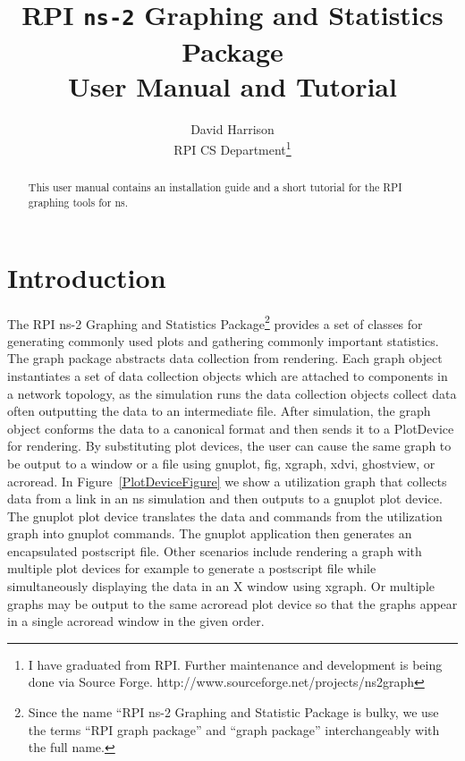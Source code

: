 \documentclass[11pt]{article}
\begin{document}

\title{RPI \verb|ns-2| Graphing and Statistics Package\\
       User Manual and Tutorial}
\author{David Harrison \\
        RPI CS Department\footnote{I have graduated from RPI. Further maintenance and development is being done via Source Forge. http://www.sourceforge.net/projects/ns2graph}}

\maketitle

\begin{abstract}
This user manual contains an installation guide and a short
tutorial for the RPI graphing tools for ns.
\end{abstract}


\section{Introduction}

The RPI ns-2 Graphing and Statistics Package\footnote{Since the name
``RPI ns-2 Graphing and Statistic Package is bulky, we use the
terms ``RPI graph package'' and ``graph package'' interchangeably with
the full name.} provides a set of classes for generating commonly used
plots and gathering commonly important statistics.  The graph package
abstracts data collection from rendering.  Each graph object
instantiates a set of data collection objects which are attached to
components in a network topology, as the simulation runs the data
collection objects collect data often outputting the data to an
intermediate file.  After simulation, the graph object conforms the
data to a canonical format and then sends it to a PlotDevice for
rendering.  By substituting plot devices, the user can cause the same
graph to be output to a window or a file using gnuplot, fig, xgraph,
xdvi, ghostview, or acroread.  In Figure~\ref{PlotDeviceFigure} we
show a utilization graph that collects data from a link in an ns
simulation and then outputs to a gnuplot plot device.  The gnuplot plot
device translates the data and commands from the utilization graph
into gnuplot commands.  The gnuplot application then generates an
encapsulated postscript file.  Other scenarios include rendering a
graph with multiple plot devices for example to generate a postscript
file while simultaneously displaying the data in an X window using
xgraph.  Or multiple graphs may be output to the same acroread plot
device so that the graphs appear in a single acroread window in the
given order.
\end{document}
